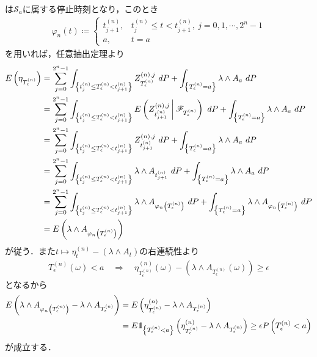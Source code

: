 \begin{prf}
\begin{description}
\begin{align}
				\end{align}
				は$\mathscr{S}_a$に属する停止時刻となり，このとき
				\begin{align}
					\varphi_n(t) \coloneqq 
					\begin{cases}
						t^{(n)}_{j+1}, & t^{(n)}_j \leq t < t^{(n)}_{j+1},\ j=0,1,\cdots,2^n-1 \\
						a, & t = a
					\end{cases}
				\end{align}
				を用いれば，任意抽出定理より
				\begin{align}
					E\left( \eta_{T^{(n)}_\epsilon} \right)
					&= \sum_{j=0}^{2^n-1} \int_{\left\{t^{(n)}_j \leq T^{(n)}_\epsilon < t^{(n)}_{j+1}\right\}} Z^{(n),j}_{T^{(n)}_\epsilon}\ dP
						+ \int_{\left\{T^{(n)}_\epsilon = a\right\}} \lambda \wedge A_a\ dP \\
					&= \sum_{j=0}^{2^n-1} \int_{\left\{t^{(n)}_j \leq T^{(n)}_\epsilon < t^{(n)}_{j+1}\right\}} E\left( Z^{(n),j}_{t^{(n)}_{j+1}} \, \middle|\, \mathscr{F}_{T^{(n)}_\epsilon} \right)\ dP
						+ \int_{\left\{T^{(n)}_\epsilon = a\right\}} \lambda \wedge A_a\ dP \\
					&= \sum_{j=0}^{2^n-1} \int_{\left\{t^{(n)}_j \leq T^{(n)}_\epsilon < t^{(n)}_{j+1}\right\}} Z^{(n),j}_{t^{(n)}_{j+1}}\ dP
						+ \int_{\left\{T^{(n)}_\epsilon = a\right\}} \lambda \wedge A_a\ dP \\
					&= \sum_{j=0}^{2^n-1} \int_{\left\{t^{(n)}_j \leq T^{(n)}_\epsilon < t^{(n)}_{j+1}\right\}} \lambda \wedge A_{t^{(n)}_{j+1}}\ dP
						+ \int_{\left\{T^{(n)}_\epsilon = a\right\}} \lambda \wedge A_a\ dP \\
					&= \sum_{j=0}^{2^n-1} \int_{\left\{t^{(n)}_j \leq T^{(n)}_\epsilon < t^{(n)}_{j+1}\right\}} \lambda \wedge A_{\varphi_n\left(T^{(n)}_\epsilon\right)}\ dP
						+ \int_{\left\{T^{(n)}_\epsilon = a\right\}} \lambda \wedge A_{\varphi_n\left(T^{(n)}_\epsilon\right)}\ dP \\
					&= E\left(\lambda \wedge A_{\varphi_n\left(T^{(n)}_\epsilon\right)}\right)
				\end{align}
				が従う．また$t \longmapsto \eta^{(n)}_t - (\lambda \wedge A_t)$の右連続性より
				\begin{align}
					T^{(n)}_\epsilon(\omega) < a
					\quad \Longrightarrow
					\quad \eta^{(n)}_{T^{(n)}_\epsilon}(\omega) - \left(\lambda \wedge A_{T^{(n)}_\epsilon}(\omega)\right)
						\geq \epsilon
				\end{align}
				となるから
				\begin{align}
					E\left(\lambda \wedge A_{\varphi_n\left(T^{(n)}_\epsilon\right)}
						- \lambda \wedge A_{T^{(n)}_\epsilon} \right)
					&= E\left(\eta^{(n)}_{T^{(n)}_\epsilon}
						- \lambda \wedge A_{T^{(n)}_\epsilon} \right) \\
					&= E\mbox{1}\hspace{-0.25em}\mbox{l}_{\left\{T^{(n)}_\epsilon < a\right\}}\left(\eta^{(n)}_{T^{(n)}_\epsilon}
						- \lambda \wedge A_{T^{(n)}_\epsilon} \right)
					\geq \epsilon P\left(T^{(n)}_\epsilon < a\right)
					\label{eq:chapter_1_theorem_4_14_5}
				\end{align}
				が成立する．
				

\end{description}
\end{prf}
